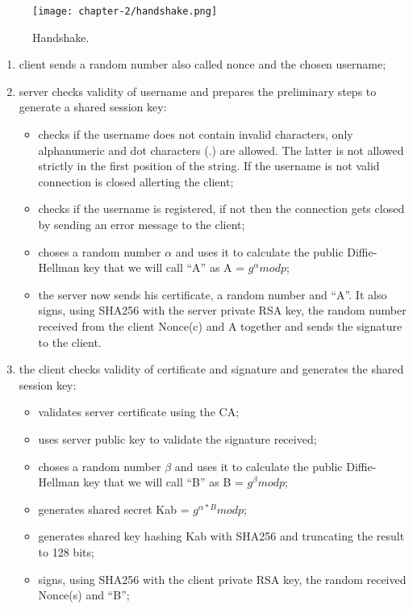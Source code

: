 \begin{figure}[!h] 
    \centering 
    \texttt{[image: chapter-2/handshake.png]} 
    \caption{Handshake.}
    \label{fig:handshake}
\end{figure}
\newpage{}
\begin{enumerate}
	\item client sends a random number also called nonce and the chosen username;
	\item server checks validity of username and prepares the preliminary steps to generate a shared session key:
	\begin{itemize}
		\item checks if the username does not contain invalid characters, only alphanumeric and dot characters (.) are allowed. The latter is not allowed strictly in the first position of the string. If the username is not valid connection is closed allerting the client;
		\item checks if the username is registered, if not then the connection gets closed by sending an error message to the client;
		\item choses a random number \(\alpha\) and uses it to calculate the public Diffie-Hellman key that we will call ``A'' as A = \(g^\alpha mod p \);
		\item the server now sends his certificate, a random number and ``A''. It also signs, using SHA256 with the server private RSA key, the random number received from the client Nonce(c) and A together and sends the signature to the client.
	\end{itemize}
	\item the client checks validity of certificate and signature and generates the shared session key:
	\begin{itemize}
		\item validates server certificate using the CA;
		\item uses server public key to validate the signature received;
		\item choses a random number \(\beta\) and uses it to calculate the public Diffie-Hellman key that we will call ``B'' as B = \(g^\beta mod p \);
		\item generates shared secret Kab = \(g^{\alpha*B} mod p\);
		\item generates shared key hashing Kab with SHA256 and truncating the result to 128 bits;
		\item signs, using SHA256 with the client private RSA key, the random received Nonce(s) and ``B'';

\end{itemize}
\end{enumerate}
